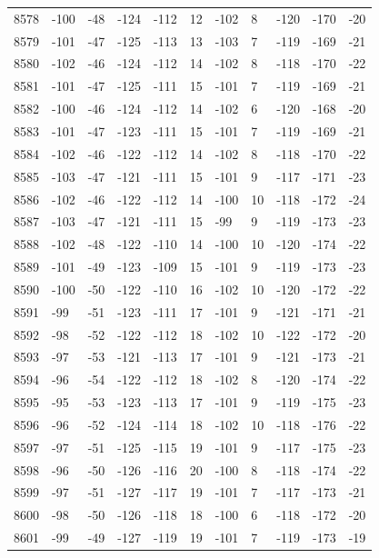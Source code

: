 \begin{table}[H]
\begin{tabular}{lllllllllll}
8578 & -100 & -48 & -124 & -112 & 12 & -102 & 8 & -120 & -170 & -20 \\
8579 & -101 & -47 & -125 & -113 & 13 & -103 & 7 & -119 & -169 & -21 \\
8580 & -102 & -46 & -124 & -112 & 14 & -102 & 8 & -118 & -170 & -22 \\
8581 & -101 & -47 & -125 & -111 & 15 & -101 & 7 & -119 & -169 & -21 \\
8582 & -100 & -46 & -124 & -112 & 14 & -102 & 6 & -120 & -168 & -20 \\
8583 & -101 & -47 & -123 & -111 & 15 & -101 & 7 & -119 & -169 & -21 \\
8584 & -102 & -46 & -122 & -112 & 14 & -102 & 8 & -118 & -170 & -22 \\
8585 & -103 & -47 & -121 & -111 & 15 & -101 & 9 & -117 & -171 & -23 \\
8586 & -102 & -46 & -122 & -112 & 14 & -100 & 10 & -118 & -172 & -24 \\
8587 & -103 & -47 & -121 & -111 & 15 & -99 & 9 & -119 & -173 & -23 \\
8588 & -102 & -48 & -122 & -110 & 14 & -100 & 10 & -120 & -174 & -22 \\
8589 & -101 & -49 & -123 & -109 & 15 & -101 & 9 & -119 & -173 & -23 \\
8590 & -100 & -50 & -122 & -110 & 16 & -102 & 10 & -120 & -172 & -22 \\
8591 & -99 & -51 & -123 & -111 & 17 & -101 & 9 & -121 & -171 & -21 \\
8592 & -98 & -52 & -122 & -112 & 18 & -102 & 10 & -122 & -172 & -20 \\
8593 & -97 & -53 & -121 & -113 & 17 & -101 & 9 & -121 & -173 & -21 \\
8594 & -96 & -54 & -122 & -112 & 18 & -102 & 8 & -120 & -174 & -22 \\
8595 & -95 & -53 & -123 & -113 & 17 & -101 & 9 & -119 & -175 & -23 \\
8596 & -96 & -52 & -124 & -114 & 18 & -102 & 10 & -118 & -176 & -22 \\
8597 & -97 & -51 & -125 & -115 & 19 & -101 & 9 & -117 & -175 & -23 \\
8598 & -96 & -50 & -126 & -116 & 20 & -100 & 8 & -118 & -174 & -22 \\
8599 & -97 & -51 & -127 & -117 & 19 & -101 & 7 & -117 & -173 & -21 \\
8600 & -98 & -50 & -126 & -118 & 18 & -100 & 6 & -118 & -172 & -20 \\
8601 & -99 & -49 & -127 & -119 & 19 & -101 & 7 & -119 & -173 & -19 \\

\end{tabular}
\end{table}
